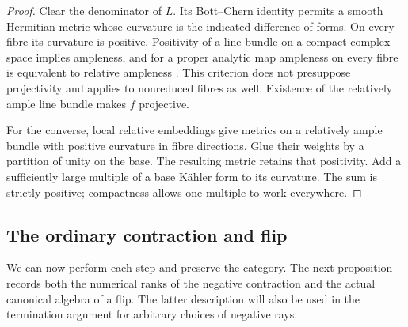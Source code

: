 \begin{proof}
Clear the denominator of $L$.  Its Bott--Chern identity permits a smooth
Hermitian metric whose curvature is the indicated difference of forms.
On every fibre its curvature is positive.  Positivity of a line bundle
on a compact complex space implies ampleness, and for a proper analytic
map ampleness on every fibre is equivalent to relative ampleness
\cite[Corollary~1.12 and Definition~3.1--Remark~3.2]{FujinoVanishing2026}.
This criterion does not presuppose projectivity and applies to
nonreduced fibres as well.  Existence of the relatively ample line bundle
makes $f$ projective.

For the converse, local relative embeddings give metrics on a relatively
ample bundle with positive curvature in fibre directions.  Glue their
weights by a partition of unity on the base.  The resulting metric
retains that positivity.  Add a sufficiently large multiple of a base
K\"ahler form to its curvature.  The sum is strictly positive; compactness
allows one multiple to work everywhere.
\end{proof}

\subsection{The ordinary contraction and flip}

We can now perform each step and preserve the category.  The next
proposition records both the numerical ranks of the negative contraction
and the actual canonical algebra of a flip.  The latter description will
also be used in the termination argument for arbitrary choices of negative rays.


